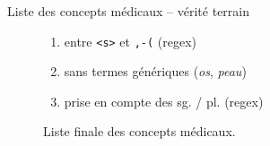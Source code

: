\begin{frame}{Liste des concepts médicaux -- vérité terrain}
\begin{figure}[!htb]
\begin{minipage}{.5\textwidth}
			\caption{Liste finale des concepts médicaux.}
			\label{fig:prob1_6_2}
		\end{minipage}%
		\begin{minipage}{.6\textwidth}
			\centering
			\begin{enumerate}
				\setcounter{enumi}{0}
				\item entre \texttt{<s>} et \texttt{,-(} (regex)
				\item sans termes génériques (\textit{os}, \textit{peau})
				\item prise en compte des sg. / pl. (regex)
			\end{enumerate}
		\end{minipage}
	\end{figure}
\end{frame}

